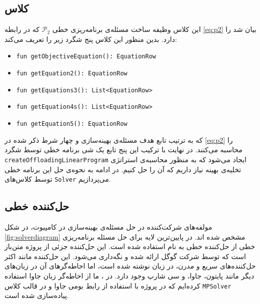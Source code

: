 \subsection{کلاس }
این کلاس وظیفه ساخت مسئله‌ی برنامه‌ریزی خطی
$\mathcal{P}_2$
که در رابطه \ref{eq:p2} بیان شد را دارد. بدین منظور این کلاس پنج شگرد زیر را تعریف می‌کند:
\begin{latin}
	\begin{itemize}
		\item \texttt{\footnotesize fun getObjectiveEquation(): EquationRow}
		\item \texttt{\footnotesize fun getEquation2(): EquationRow}
		\item \texttt{\footnotesize fun getEquations3(): List<EquationRow>}
		\item \texttt{\footnotesize fun getEquation4s(): List<EquationRow>}
		\item \texttt{\footnotesize fun getEquation5(): EquationRow}
	\end{itemize}
\end{latin}
که به ترتیب تابع هدف مسئله‌ی بهینه‌سازی و چهار شرط ذکر شده در \ref{eq:p2} را محاسبه می‌کنند. در نهایت با ترکیب این پنج تابع یک شی برنامه خطی توسط شگرد \texttt{\footnotesize createOffloadingLinearProgram} ایجاد می‌شود که به منظور محاسبه‌ی استراتژی تخلیه‌ی بهینه نیاز داریم که آن را حل کنیم. در ادامه به نحوه‌ی حل این برنامه خطی توسط کلاس‌های \texttt{\footnotesize Solver} می‌پردازیم.
\subsection{حل‌کننده خطی}
مولفه‌های شرکت‌کننده در حل مسئله‌ی بهینه‌سازی در کامپیوت، در شکل \ref{fig:solverdiagram} مشخص شده اند. در پایین‌ترین لایه برای حل مسئله برنامه‌ریزی خطی از حل‌کننده خطی  به نام  استفاده شده است. این حل‌کننده جزئی از پروژه متن‌باز  است که توسط شرکت گوگل ارائه شده و نگه‌داری می‌شود. \cite{glop} این حل‌کننده مانند اکثر حل‌کننده‌های سریع و مدرن، در زبان  نوشته شده است، اما احاطه‌گرهای آن در زبان‌های دیگر مانند پایتون، جاوا، و سی شارپ وجود دارد. در \CurrentProject، ما از احاطه‌گر زبان جاوا استفاده کرده‌ایم که در پروژه  با استفاده از رابط بومی جاوا و در قالب کلاس \texttt{\footnotesize MPSolver} پیاده‌سازی شده است. \\

